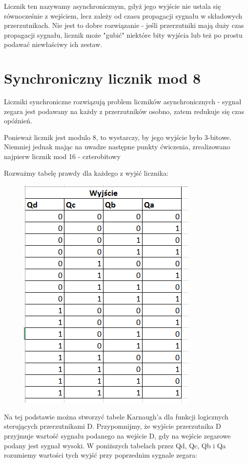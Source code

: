 \documentclass[12pt,a4paper]{article}
\begin{document}
\par
Licznik ten nazywamy asynchronicznym, gdyż jego wyjście nie ustala się równocześnie z wejściem, lecz zależy od czasu propagacji sygnału w składowych przerzutnikach. Nie jest to dobre rozwiązanie - jeśli przerzutniki mają duży czas propagacji sygnału, licznik może "gubić" niektóre bity wyjścia lub też po prostu podawać niewłaściwy ich zestaw.

\section{Synchroniczny licznik mod 8}

Liczniki synchroniczne rozwiązują problem liczników asynchronicznych - sygnał zegara jest podawany na każdy z przerzutników osobno, zatem redukuje się czas opóźnień.



Ponieważ licznik jest modulo 8, to wystarczy, by jego wyjście było 3-bitowe.
Niemniej jednak mając na uwadze następne punkty ćwiczenia, zrealizowano najpierw licznik mod 16 - czterobitowy

Rozważmy tabelę prawdy dla każdego z wyjść licznika:

\begin{figure}[H]
\centering
\includegraphics{img/4c_table_4bit}
\end{figure}

Na tej podstawie można stworzyć tabele Karnaugh'a dla funkcji logicznych sterujących przerzutnikami D.
Przypomnijmy, że wyjście przerzutnika D przyjmuje wartość sygnału podanego na wejście D, gdy na wejście zegarowe podany jest sygnał wysoki.
W poniższych tabelach przez Qd, Qc, Qb i Qa rozumiemy wartości tych wyjść przy poprzednim sygnale zegara:
\end{document}
